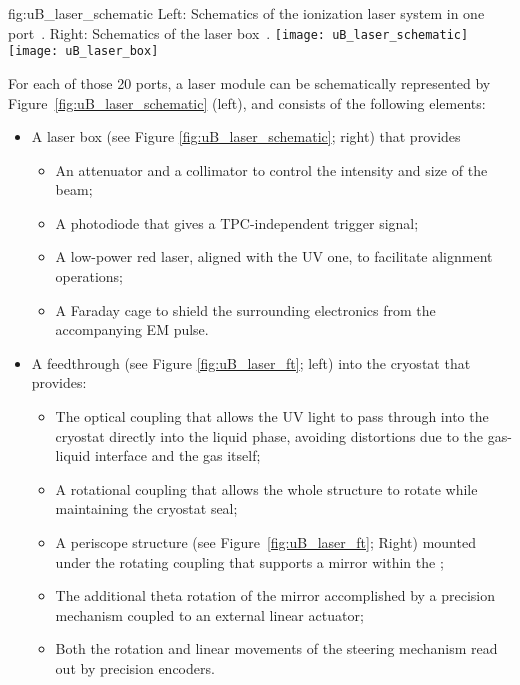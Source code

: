 \begin{dunefigure}{fig:uB_laser_schematic}
{Left: Schematics of the ionization laser system in one port~\cite{Antonello:2015lea}. Right: Schematics of the laser box~\cite{microboone}.}
\texttt{[image: uB\_laser\_schematic]}
\texttt{[image: uB\_laser\_box]}
\end{dunefigure}



For each of those \num{20} ports, a laser module can be schematically represented by Figure~\ref{fig:uB_laser_schematic} (left), and consists of the following elements:
\begin{itemize}
    \item A laser box (see Figure \ref{fig:uB_laser_schematic}; right) that provides
    \begin{itemize}
        \item An attenuator and a collimator to control the intensity and size of the beam;
        \item A photodiode that gives a TPC-independent trigger signal;
        \item A low-power red laser, aligned with the UV one, to facilitate alignment operations;
        \item A Faraday cage to shield the surrounding electronics from the accompanying EM pulse.
    \end{itemize}
    \item A feedthrough (see Figure \ref{fig:uB_laser_ft}; left) into the cryostat that provides:
    \begin{itemize}
        \item The optical coupling that allows the UV light to pass through into the cryostat directly into the liquid phase, avoiding distortions due to the gas-liquid interface and the gas itself;
        \item A rotational coupling that allows the whole structure to rotate while maintaining the cryostat seal;
        \item A periscope structure (see Figure~\ref{fig:uB_laser_ft}; Right) mounted under the rotating coupling that supports a mirror within the ;
        \item The additional theta rotation of the mirror accomplished by a precision mechanism coupled to an external linear actuator;
        \item Both the rotation and linear movements of the steering mechanism read out by precision encoders.
    \end{itemize}
    
\end{itemize}


